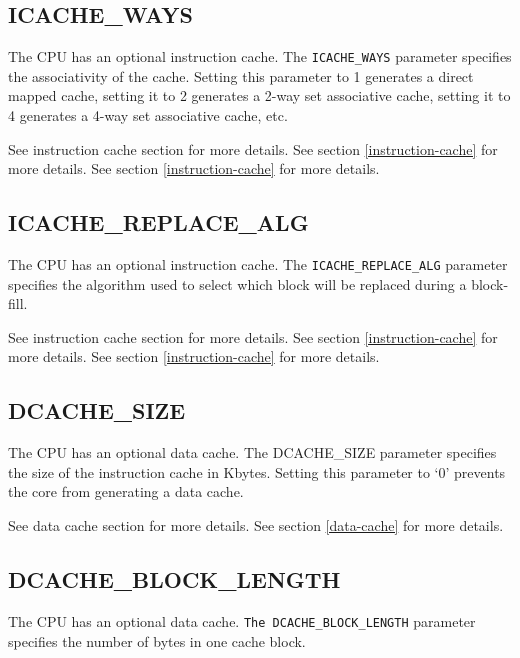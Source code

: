 \subsection{ICACHE\_WAYS}\label{icache_ways}

The CPU has an optional instruction cache. The \texttt{ICACHE\_WAYS} parameter
specifies the associativity of the cache. Setting this parameter to 1 generates
a direct mapped cache, setting it to 2 generates a 2-way set associative cache,
setting it to 4 generates a 4-way set associative cache, etc.

\ifdefined\MARKDOWN
See instruction cache section for more details.
\else
See section \ref{instruction-cache}  for more details.
\fi
See section \ref{instruction-cache}  for more details.

\subsection{ICACHE\_REPLACE\_ALG}\label{icache_replace_alg}

The CPU has an optional instruction cache. The \texttt{ICACHE\_REPLACE\_ALG}
parameter specifies the algorithm used to select which block will be
replaced during a block-fill.

\ifdefined\MARKDOWN
See instruction cache section for more details.
\else
See section \ref{instruction-cache}  for more details.
\fi
See section \ref{instruction-cache}  for more details.

\subsection{DCACHE\_SIZE}\label{dcache_size}

The CPU has an optional data cache. The DCACHE\_SIZE parameter specifies the
size of the instruction cache in Kbytes. Setting this parameter to `0' prevents
the core from generating a data cache.

\ifdefined\MARKDOWN
See data cache section for more details.
\else
See section \ref{data-cache}  for more details.
\fi

\subsection{DCACHE\_BLOCK\_LENGTH}\label{dcache_block_length}

The CPU has an optional data cache. \texttt{The DCACHE\_BLOCK\_LENGTH} parameter
specifies the number of bytes in one cache block.


